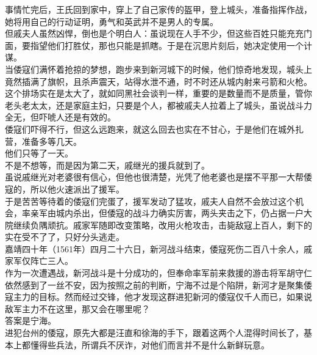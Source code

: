 \begin{multicols}{\theparacolNo}
事情忙完后，王氏回到家中，穿上了自己家传的盔甲，登上城头，准备指挥作战，她将用自己的行动证明，勇气和英武并不是男人的专属。\\

但戚夫人虽然凶悍，倒也是个明白人：虽说现在人手不少，但这些百姓只能充充门面，要指望他们打胜仗，那也只能是抓瞎。于是在沉思片刻后，她决定使用一个计谋。\\

当倭寇们满怀着抢掠的梦想，跑步来到新河城下的时候，他们惊奇地发现，城头上竟然插满了旗帜，且杀声震天，站得水泄不通，时不时还从城内射来弓箭和火枪。\\

这个排场实在是太大了，就如同黑社会谈判一样，重要的是数量而不是质量，管你老头老太太，还是家庭主妇，只要是个人，都被戚夫人拉着上了城头，虽说战斗力全无，但吓唬人还是有效的。\\

倭寇们吓得不行，但这么远跑来，就这么回去也实在不甘心，于是他们在城外扎营，准备多等几天。\\

他们只等了一天。\\

不是不想等，而是因为第二天，戚继光的援兵就到了。\\

虽说戚继光对老婆很有信心，但他也很清楚，光凭了他老婆也是摆不平那一大帮倭寇的，所以他火速派出了援军。\\

于是苦苦等待着的倭寇们完蛋了，援军发动了猛攻，戚夫人自然不会放过这个机会，率亲军由城内杀出，但倭寇的战斗力确实厉害，两头夹击之下，仍占据一户大院继续负隅顽抗。戚家军随即改变策略，改用火枪攻击，击毙敌寇上百人，剩下的实在受不了了，只好分头逃走。\\

嘉靖四十年（1561年）四月二十六日，新河战斗结束，倭寇死伤二百八十余人，戚家军仅阵亡三人。\\

作为一次遭遇战，新河战斗是十分成功的，但奉命率军前来救援的游击将军胡守仁依然感到了一丝不安，因为按照之前的判断，宁海不过是个陷阱，新河才是聚集倭寇主力的目标。然而经过交锋，他才发现这群进犯新河的倭寇仅千人而已，如果说敌军主力不在这里，那又会在哪里呢？\\

答案是宁海。\\

进犯台州的倭寇，原先大都是汪直和徐海的手下，跟着这两个人混得时间长了，基本上都懂得些兵法，所谓兵不厌诈，对他们而言并不是什么新鲜玩意。\\


\end{multicols}
